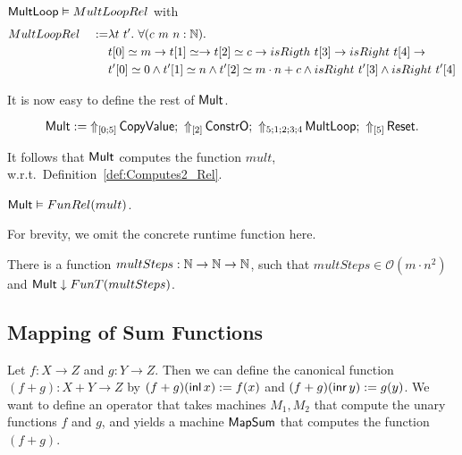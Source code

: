 \begin{lemma}
  \label{lem:Mult_Loop_Realise}
  \label{lem:Mult_Loop_Realise}
  $\MS{MultLoop} \Realise MultLoopRel$ with
  \begin{alignat*}{2}
    & MultLoopRel ~&:=& \lambda t~t'.~\forall (c~m~n:\Nat). \\
    &&& t[0] \simeq m \rightarrow t[1] \simeq \rightarrow t[2] \simeq c \rightarrow isRigth~t[3] \rightarrow isRight~t[4] \rightarrow \\
    &&& t'[0] \simeq 0 \land t'[1] \simeq n \land t'[2] \simeq m \cdot n + c \land isRight~t'[3] \land isRight~t'[4]
  \end{alignat*}
\end{lemma}

It is now easy to define the rest of $\MS{Mult}$.
\begin{definition}[$\MS{Mult}$][Mult]
  \label{def:Mult}
  \[
    \MS{Mult} :=
    \LiftTapes{\MS{CopyValue}}{\Vector{0;5}} \Seq
    \LiftTapes{\MS{ConstrO}}{\Vector{2}} \Seq
    \LiftTapes{\MS{MultLoop}}{5;1;2;3;4} \Seq
    \LiftTapes{\MS{Reset}}{\Vector{5}}.
  \]
\end{definition}

It follows that $\MS{Mult}$ computes the function $mult$, w.r.t.\ Definition~\ref{def:Computes2_Rel}.
\begin{lemma}
  \label{lem:Mult_Computes}
  $\MS{Mult} \Realise FunRel(mult)$.
\end{lemma}

For brevity,  we omit the concrete runtime function here.  
\begin{lemma}
  There is a function $multSteps : \Nat\to\Nat\to\Nat$, such that $multSteps \in \mathcal{O}(m \cdot n^2)$ and
  $\MS{Mult} \TerminatesIn FunT(multSteps)$.
\end{lemma}

\subsection{Mapping of Sum Functions}
\label{sec:SumTM}
%

Let $f : X \to Z$ and $g : Y \to Z$.  Then we can define the canonical function $(f+g) : X+Y \to Z$ by $(f+g)(\inl x):=f(x)$ and
$(f+g)(\inr y):=g(y)$.  We want to define an operator that takes machines $M_1, M_2$ that compute the unary functions $f$ and $g$, and yields a
machine $\MS{MapSum}$ that computes the function $(f+g)$.


